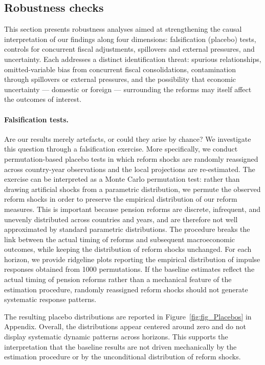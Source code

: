 \documentclass[11pt,english,a4paper, twoside, authoryear]{article}
\begin{document}
\FloatBarrier

\subsection{Robustness checks}

This section presents robustness analyses aimed at strengthening the causal interpretation of our findings along four dimensions: falsification (placebo) tests, controls for concurrent fiscal adjustments, spillovers and external pressures, and uncertainty. Each addresses a distinct identification threat: spurious relationships, omitted-variable bias from concurrent fiscal consolidations, contamination through spillovers or external pressures, and the possibility that economic uncertainty --- domestic or foreign --- surrounding the reforms may itself affect the outcomes of interest.

\paragraph{Falsification tests.} Are our results merely artefacts, or could they arise by chance? We investigate this question through a falsification exercise. More specifically, we conduct permutation-based placebo tests in which reform shocks are randomly reassigned across country-year observations and the local projections are re-estimated. The exercise can be interpreted as a Monte Carlo permutation test: rather than drawing artificial shocks from a parametric distribution, we permute the observed reform shocks in order to preserve the empirical distribution of our reform measures. This is important because pension reforms are discrete, infrequent, and unevenly distributed across countries and years, and are therefore not well approximated by standard parametric distributions. The procedure breaks the link between the actual timing of reforms and subsequent macroeconomic outcomes, while keeping the distribution of reform shocks unchanged. For each horizon, we provide ridgeline plots reporting the empirical distribution of impulse responses
obtained from 1000 permutations. If the baseline estimates reflect the actual timing of pension
reforms rather than a mechanical feature of the estimation procedure, randomly reassigned
reform shocks should not generate systematic response patterns.

The resulting placebo distributions are reported in Figure~\ref{fig:fig_Placebos} in Appendix. Overall, the distributions appear centered around zero and do not display systematic dynamic patterns across horizons. This supports the interpretation that the baseline results are not driven mechanically by the estimation procedure or by the unconditional distribution of reform shocks.
\end{document}
